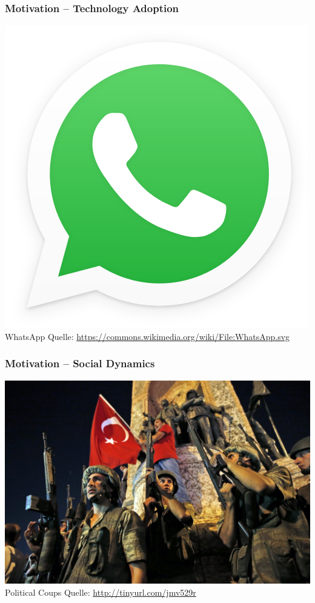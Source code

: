 \documentclass[slidestop,usenames,dvipsnames]{beamer}
\begin{document}
\begin{frame}
    \frametitle{Motivation -- Technology Adoption}
    \begin{center}
        \includegraphics[height=0.65\textheight]{img/whatsapp}
        \vfill\vspace{8pt}
        {\huge WhatsApp}
        \vfill\vspace{8pt}
        {\small Quelle: \url{https://commons.wikimedia.org/wiki/File:WhatsApp.svg}}
    \end{center}
    \vfill
\end{frame}

\begin{frame}
    \frametitle{Motivation -- Social Dynamics}
    \begin{center}
        \includegraphics[height=0.65\textheight]{img/coup}
        \vfill\vspace{8pt}
        {\huge Political Coups}
        \vfill\vspace{8pt}
        {\small Quelle: \url{http://tinyurl.com/jmv529r}}
    \end{center}
    \vfill
\end{frame}
\end{document}
